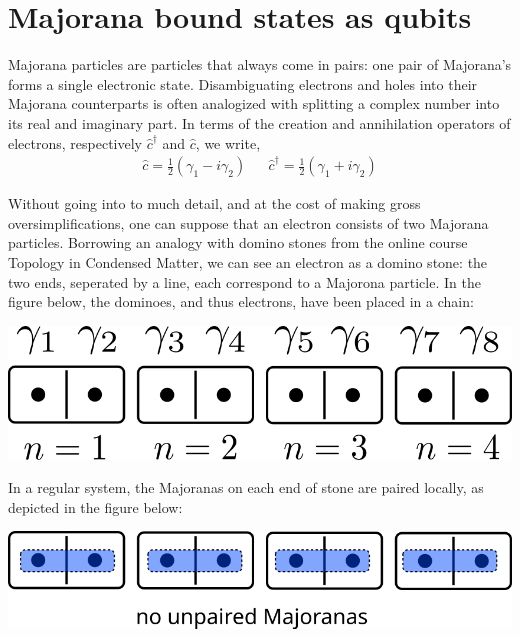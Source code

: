 \section{Majorana bound states as qubits}

	Majorana particles are particles that always come in pairs: one pair of Majorana's forms a single electronic state.
	Disambiguating electrons and holes into their Majorana counterparts is often analogized with splitting a complex number into its real and imaginary part.
	In terms of the creation and annihilation operators of electrons, respectively $\hat{c}^\dagger$ and $\hat{c}$, we write,
	\begin{align}
		\hat{c} =  \frac{1}{2} \left( \gamma_1 - i\gamma_2 \right) && \hat{c}^\dagger = \frac{1}{2} \left( \gamma_1 + i\gamma_2 \right)
	\end{align}

	Without going into to much detail, and at the cost of making gross oversimplifications, one can suppose that an electron consists of two Majorana particles.
	Borrowing an analogy with domino stones from the online course Topology in Condensed Matter\cite{noauthor_topology_2015}, we can see an electron as a domino stone: the two ends, seperated by a line, each correspond to a Majorona particle.
	In the figure below\cite{noauthor_topology_2015}, the dominoes, and thus electrons, have been placed in a chain:\\
	
	
	\begin{centering}
	\includegraphics[width=0.95\columnwidth]{images/majorana_dominoes}
	\end{centering}
	
	In a regular system, the Majoranas on each end of stone are paired locally, as depicted in the figure below:\\

	\begin{centering}
	\includegraphics[width=0.95\columnwidth]{images/trivial_dominoes}
	\end{centering}
	
